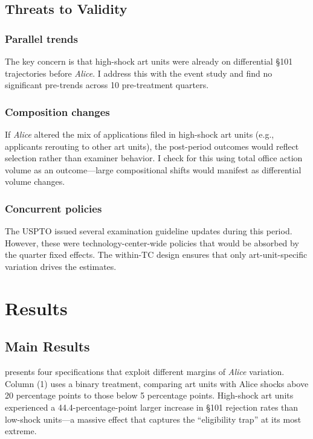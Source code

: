\documentclass[12pt]{article}
\begin{document}
\subsection{Threats to Validity}

\subsubsection*{Parallel trends} The key concern is that high-shock art units were already on differential \S101 trajectories before \textit{Alice}. I address this with the event study and find no significant pre-trends across 10 pre-treatment quarters.

\subsubsection*{Composition changes} If \textit{Alice} altered the mix of applications filed in high-shock art units (e.g., applicants rerouting to other art units), the post-period outcomes would reflect selection rather than examiner behavior. I check for this using total office action volume as an outcome---large compositional shifts would manifest as differential volume changes.

\subsubsection*{Concurrent policies} The USPTO issued several examination guideline updates during this period. However, these were technology-center-wide policies that would be absorbed by the quarter fixed effects. The within-TC design ensures that only art-unit-specific variation drives the estimates.


\section{Results}

\subsection{Main Results}

 presents four specifications that exploit different margins of \textit{Alice} variation. Column (1) uses a binary treatment, comparing art units with Alice shocks above 20 percentage points to those below 5 percentage points. High-shock art units experienced a 44.4-percentage-point larger increase in \S101 rejection rates than low-shock units---a massive effect that captures the ``eligibility trap'' at its most extreme.
\end{document}
